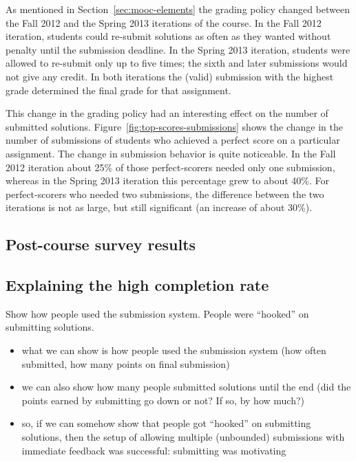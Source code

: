 \documentclass{sig-alternate}
\begin{document}
As mentioned in Section~\ref{sec:mooc-elements} the grading policy changed
between the Fall 2012 and the Spring 2013 iterations of the course. In the
Fall 2012 iteration, students could re-submit solutions as often as they
wanted without penalty until the submission deadline. In the Spring 2013
iteration, students were allowed to re-submit only up to five times; the sixth
and later submissions would not give any credit. In both iterations the
(valid) submission with the highest grade determined the final grade for that
assignment.

This change in the grading policy had an interesting effect on the number of
submitted solutions. Figure~\ref{fig:top-scores-submissions} shows the change
in the number of submissions of students who achieved a perfect score on a
particular assignment. The change in submission behavior is quite noticeable.
In the Fall 2012 iteration about 25\% of those perfect-scorers needed only one
submission, whereas in the Spring 2013 iteration this percentage grew to about
40\%. For perfect-scorers who needed two submissions, the difference between
the two iterations is not as large, but still significant (an increase of
about 30\%).

\subsection{Post-course survey results}


\subsection{Explaining the high completion rate}

Show how people used the submission system. People were ``hooked'' on submitting solutions.

\begin{itemize}

\item what we can show is how people used the submission system (how often submitted, how
  many points on final submission)

\item we can also show how many people submitted solutions until the end (did the points
  earned by submitting go down or not? If so, by how much?)

\item so, if we can somehow show that people got ``hooked'' on submitting solutions, then
  the setup of allowing multiple (unbounded) submissions with immediate feedback was
  successful: submitting was motivating

\end{itemize}
\end{document}
